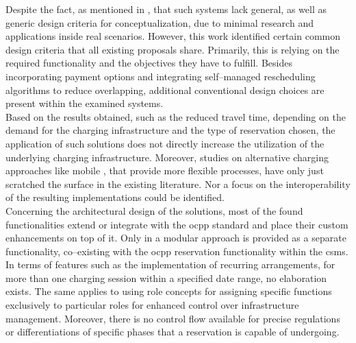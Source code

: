 \noindent Despite the fact, as mentioned in \cite{basmadjian_interoperable_2019}, that such systems lack general, as well as generic design criteria for conceptualization, due to minimal research and applications inside real scenarios.
However, this work identified certain common design criteria that all existing proposals share.
Primarily, this is relying on the required functionality and the objectives they have to fulfill.
Besides incorporating payment options and integrating self--managed rescheduling algorithms to reduce overlapping, additional conventional design choices are present within the examined systems. \\
\noindent Based on the results obtained, such as the reduced travel time, depending on the demand for the charging infrastructure and the type of reservation chosen, the application of such solutions does not directly increase the utilization of the underlying charging infrastructure.
Moreover, studies on alternative charging approaches like mobile , that provide more flexible processes, have only just scratched the surface in the existing literature. Nor a focus on the interoperability of the resulting implementations could be identified. \\
\noindent Concerning the architectural design of the solutions, most of the found functionalities extend or integrate with the \acrshort{ocpp} standard and place their custom enhancements on top of it. 
Only in \cite{flocea_electric_2022} a modular approach is provided as a separate functionality, co--existing with the \acrshort{ocpp} reservation functionality within the \acrshort{csms}.
In terms of features such as the implementation of recurring arrangements, for more than one charging session within a specified date range, no elaboration exists. 
The same applies to using role concepts for assigning specific functions exclusively to particular roles for enhanced control over infrastructure management.
Moreover, there is no control flow available for precise regulations or differentiations of specific phases that a reservation is capable of undergoing. 
